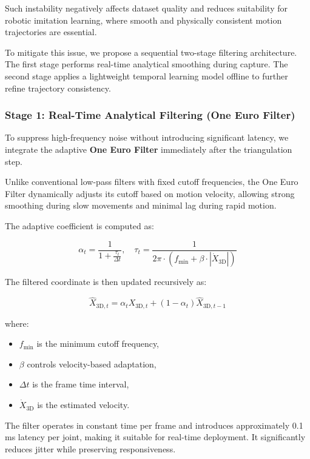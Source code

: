 Such instability negatively affects dataset quality and reduces suitability 
for robotic imitation learning, where smooth and physically consistent motion 
trajectories are essential.

To mitigate this issue, we propose a sequential two-stage filtering architecture. 
The first stage performs real-time analytical smoothing during capture. 
The second stage applies a lightweight temporal learning model offline to 
further refine trajectory consistency.

\subsubsection{Stage 1: Real-Time Analytical Filtering (One Euro Filter)}

To suppress high-frequency noise without introducing significant latency, 
we integrate the adaptive \textbf{One Euro Filter} immediately after the 
triangulation step.

Unlike conventional low-pass filters with fixed cutoff frequencies, the 
One Euro Filter dynamically adjusts its cutoff based on motion velocity, 
allowing strong smoothing during slow movements and minimal lag during 
rapid motion.

The adaptive coefficient is computed as:

\begin{equation}
\alpha_t = \frac{1}{1 + \frac{\tau_t}{\Delta t}}, 
\quad 
\tau_t = \frac{1}{2\pi \cdot (f_{\text{min}} + \beta \cdot |\dot{X}_{\text{3D}}|)}
\end{equation}

The filtered coordinate is then updated recursively as:

\begin{equation}
\hat{X}_{\text{3D}, t} = \alpha_t X_{\text{3D}, t} + (1 - \alpha_t)\hat{X}_{\text{3D}, t-1}
\end{equation}

where:
\begin{itemize}
    \item $f_{\text{min}}$ is the minimum cutoff frequency,
    \item $\beta$ controls velocity-based adaptation,
    \item $\Delta t$ is the frame time interval,
    \item $\dot{X}_{\text{3D}}$ is the estimated velocity.
\end{itemize}

The filter operates in constant time per frame and introduces approximately 
0.1 ms latency per joint, making it suitable for real-time deployment. 
It significantly reduces jitter while preserving responsiveness.

